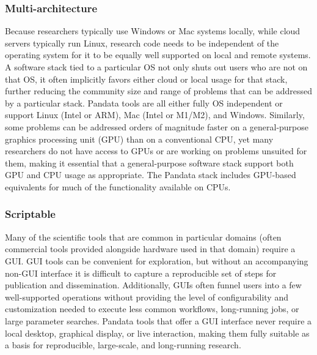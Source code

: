\subsubsection{Multi-architecture}
Because researchers typically use Windows or Mac systems locally, while cloud servers typically run Linux, research code needs to be independent of the operating system for it to be equally well supported on local and remote systems. A software stack tied to a particular OS not only shuts out users who are not on that OS, it often implicitly favors either cloud or local usage for that stack, further reducing the community size and range of problems that can be addressed by a particular stack. Pandata tools are all either fully OS independent or support Linux (Intel or ARM), Mac (Intel or M1/M2), and Windows. Similarly, some problems can be addressed orders of magnitude faster on a general-purpose graphics processing unit (GPU) than on a conventional CPU, yet many researchers do not have access to GPUs or are working on problems unsuited for them, making it essential that a general-purpose software stack support both GPU and CPU usage as appropriate. The Pandata stack includes GPU-based equivalents for much of the functionality available on CPUs.

\subsubsection{Scriptable}
Many of the scientific tools that are common in particular domains (often commercial tools provided alongside hardware used in that domain) require a GUI. GUI tools can be convenient for exploration, but without an accompanying non-GUI interface it is difficult to capture a reproducible set of steps for publication and dissemination. Additionally, GUIs often funnel users into a few well-supported operations without providing the level of configurability and customization needed to execute less common workflows, long-running jobs, or large parameter searches. Pandata tools that offer a GUI interface never require a local desktop, graphical display, or live interaction, making them fully suitable as a basis for reproducible, large-scale, and long-running research.

